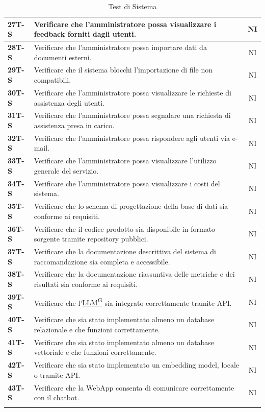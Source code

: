 \documentclass{article}
\begin{document}
\begin{longtable}{|>{\centering\arraybackslash}m{}|>{\raggedright\arraybackslash}m{}|c|}
    \hline
    \textbf{27T-S} & Verificare che l’amministratore possa visualizzare i feedback forniti dagli utenti. & NI \\
    \hline
    \textbf{28T-S} & Verificare che l’amministratore possa importare dati da documenti esterni. & NI \\
    \hline
    \textbf{29T-S} & Verificare che il sistema blocchi l’importazione di file non compatibili. & NI \\
    \hline
    \textbf{30T-S} & Verificare che l’amministratore possa visualizzare le richieste di assistenza degli utenti. & NI \\
    \hline
    \textbf{31T-S} & Verificare che l’amministratore possa segnalare una richiesta di assistenza presa in carico. & NI \\
    \hline
    \textbf{32T-S} & Verificare che l’amministratore possa rispondere agli utenti via e-mail. & NI \\
    \hline
    \textbf{33T-S} & Verificare che l’amministratore possa visualizzare l’utilizzo generale del servizio. & NI \\
    \hline
    \textbf{34T-S} & Verificare che l’amministratore possa visualizzare i costi del sistema. & NI \\
    \hline
    \textbf{35T-S} & Verificare che lo schema di progettazione della base di dati sia conforme ai requisiti. & NI \\
    \hline
    \textbf{36T-S} & Verificare che il codice prodotto sia disponibile in formato sorgente tramite repository pubblici. & NI \\
    \hline
    \textbf{37T-S} & Verificare che la documentazione descrittiva del sistema di raccomandazione sia completa e accessibile. & NI \\
    \hline
    \textbf{38T-S} & Verificare che la documentazione riassuntiva delle metriche e dei risultati sia conforme ai requisiti. & NI \\
    \hline
    \textbf{39T-S} & Verificare che l’\href{https://code7crusaders.github.io/docs/PB/documentazione_interna/glossario.html#llm-large-language-model}{LLM\textsuperscript{G}} sia integrato correttamente tramite API. & NI \\
    \hline
    \textbf{40T-S} & Verificare che sia stato implementato almeno un database relazionale e che funzioni correttamente. & NI \\
    \hline
    \textbf{41T-S} & Verificare che sia stato implementato almeno un database vettoriale e che funzioni correttamente. & NI \\
    \hline
    \textbf{42T-S} & Verificare che sia stato implementato un embedding model, locale o tramite API. & NI \\
    \hline
    \textbf{43T-S} & Verificare che la WebApp consenta di comunicare correttamente con il chatbot. & NI \\
    \hline
\caption{Test di Sistema}
\end{longtable}
\end{document}
